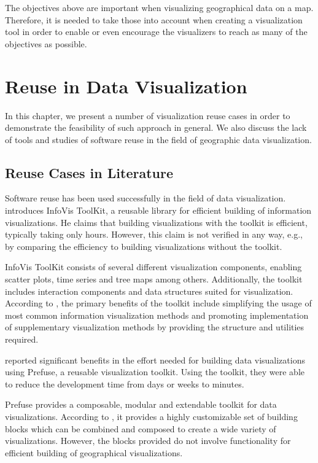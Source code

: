 The objectives above are important when visualizing geographical data on a map. Therefore, it is needed to take those into account when creating a visualization tool in order to enable or even encourage the visualizers to reach as many of the objectives as possible.

\chapter{Reuse in Data Visualization}
\label{chapter:reuseinvisualization}

In this chapter, we present a number of visualization reuse cases in order to demonstrate the feasibility of such approach in general. We also discuss the lack of tools and studies of software reuse in the field of geographic data visualization.

\section{Reuse Cases in Literature}

Software reuse has been used successfully in the field of data visualization. \citet{fekete_infovis_2004} introduces InfoVis ToolKit, a reusable library for efficient building of information visualizations. He claims that building visualizations with the toolkit is efficient, typically taking only hours. However, this claim is not verified in any way, e.g., by comparing the efficiency to building visualizations without the toolkit.

InfoVis ToolKit consists of several different visualization components, enabling scatter plots, time series and tree maps among others. Additionally, the toolkit includes interaction components and data structures suited for visualization. According to \citeauthor{fekete_infovis_2004}, the primary benefits of the toolkit include simplifying the usage of most common information visualization methods and promoting implementation of supplementary visualization methods by providing the structure and utilities required.

\citet{heer_prefuse:_2005} reported significant benefits in the effort needed for building data visualizations using Prefuse, a reusable visualization toolkit. Using the toolkit, they were able to reduce the development time from days or weeks to minutes.

Prefuse provides a composable, modular and extendable toolkit for data visualizations. According to \citet{heer_prefuse:_2005}, it provides a highly customizable set of building blocks which can be combined and composed to create a wide variety of visualizations. However, the blocks provided do not involve functionality for efficient building of geographical visualizations.

